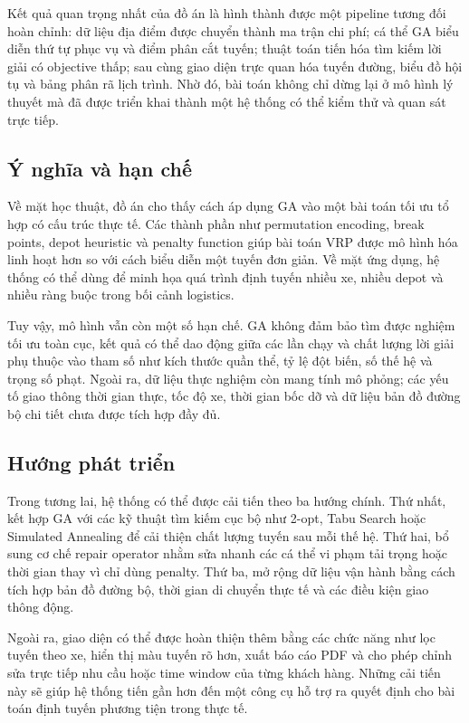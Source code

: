 \documentclass[12pt,a4paper]{article}
\numberwithin{figure}{subsection}
\numberwithin{table}{subsection}
\begin{document}
Kết quả quan trọng nhất của đồ án là hình thành được một pipeline tương đối hoàn chỉnh: dữ liệu địa điểm được chuyển thành ma trận chi phí; cá thể GA biểu diễn thứ tự phục vụ và điểm phân cắt tuyến; thuật toán tiến hóa tìm kiếm lời giải có objective thấp; sau cùng giao diện trực quan hóa tuyến đường, biểu đồ hội tụ và bảng phân rã lịch trình. Nhờ đó, bài toán không chỉ dừng lại ở mô hình lý thuyết mà đã được triển khai thành một hệ thống có thể kiểm thử và quan sát trực tiếp.

\subsection{Ý nghĩa và hạn chế}

Về mặt học thuật, đồ án cho thấy cách áp dụng GA vào một bài toán tối ưu tổ hợp có cấu trúc thực tế. Các thành phần như permutation encoding, break points, depot heuristic và penalty function giúp bài toán VRP được mô hình hóa linh hoạt hơn so với cách biểu diễn một tuyến đơn giản. Về mặt ứng dụng, hệ thống có thể dùng để minh họa quá trình định tuyến nhiều xe, nhiều depot và nhiều ràng buộc trong bối cảnh logistics.

Tuy vậy, mô hình vẫn còn một số hạn chế. GA không đảm bảo tìm được nghiệm tối ưu toàn cục, kết quả có thể dao động giữa các lần chạy và chất lượng lời giải phụ thuộc vào tham số như kích thước quần thể, tỷ lệ đột biến, số thế hệ và trọng số phạt. Ngoài ra, dữ liệu thực nghiệm còn mang tính mô phỏng; các yếu tố giao thông thời gian thực, tốc độ xe, thời gian bốc dỡ và dữ liệu bản đồ đường bộ chi tiết chưa được tích hợp đầy đủ.

\subsection{Hướng phát triển}

Trong tương lai, hệ thống có thể được cải tiến theo ba hướng chính. Thứ nhất, kết hợp GA với các kỹ thuật tìm kiếm cục bộ như 2-opt, Tabu Search hoặc Simulated Annealing để cải thiện chất lượng tuyến sau mỗi thế hệ. Thứ hai, bổ sung cơ chế repair operator nhằm sửa nhanh các cá thể vi phạm tải trọng hoặc thời gian thay vì chỉ dùng penalty. Thứ ba, mở rộng dữ liệu vận hành bằng cách tích hợp bản đồ đường bộ, thời gian di chuyển thực tế và các điều kiện giao thông động.

Ngoài ra, giao diện có thể được hoàn thiện thêm bằng các chức năng như lọc tuyến theo xe, hiển thị màu tuyến rõ hơn, xuất báo cáo PDF và cho phép chỉnh sửa trực tiếp nhu cầu hoặc time window của từng khách hàng. Những cải tiến này sẽ giúp hệ thống tiến gần hơn đến một công cụ hỗ trợ ra quyết định cho bài toán định tuyến phương tiện trong thực tế.
\end{document}
